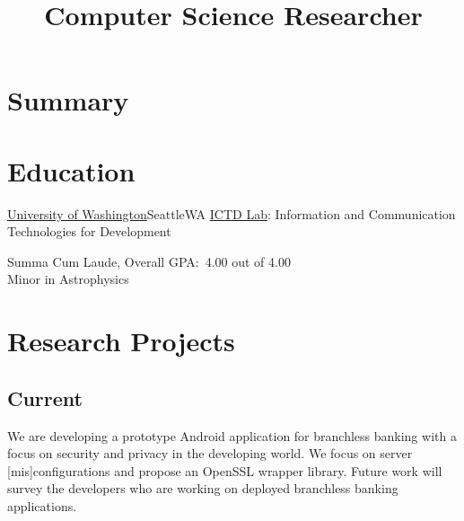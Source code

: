 \documentclass[11pt,a4paper]{moderncv}
\title{Computer Science Researcher}
\begin{document}
\maketitle

\vspace{-10mm}

\section{Summary}


\section{Education}

{\href{http://cs.washington.edu}{University of Washington}}{Seattle}{WA}
{\href{http://ictd.cs.washington.edu/people.html}{ICTD Lab}:
Information and Communication Technologies for Development
}

{Summa Cum Laude, Overall GPA:~4.00 out of 4.00\\
Minor in Astrophysics} %

\section{Research Projects}

\subsection{Current}
{We are developing a prototype Android application for branchless banking with
a focus on security and privacy in the developing world.
We focus on server [mis]configurations and propose an OpenSSL wrapper library.
Future work will survey the developers who are working on deployed branchless banking applications.}
\end{document}
